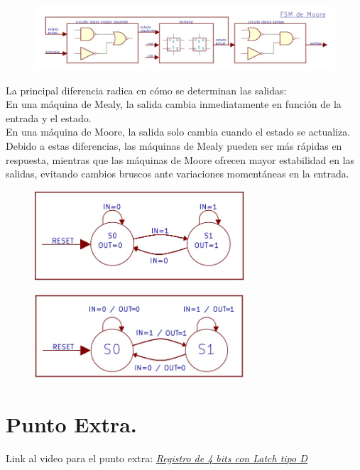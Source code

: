 \documentclass[12pt,letterpaper]{article}
\begin{document}
\begin{enumerate}
\begin{enumerate}[label=\arabic*)]
      \begin{figure}[H]
        \centering
        \includegraphics[width=1.1\textwidth]{imagen1.png}
      \end{figure}
    \end{enumerate}

    La principal diferencia radica en cómo se determinan las salidas:\\
    En una máquina de Mealy, la salida cambia inmediatamente en función de la entrada y el estado.\\
    En una máquina de Moore, la salida solo cambia cuando el estado se actualiza.\\
    Debido a estas diferencias, las máquinas de Mealy pueden ser más rápidas en respuesta, mientras que las máquinas de Moore ofrecen mayor estabilidad en las salidas, evitando cambios bruscos ante variaciones momentáneas en la entrada.
    
    \begin{figure}[H]
      \centering
      \includegraphics[width=0.7\textwidth]{imagen3.png}
    \end{figure}
    
    \begin{figure}[H]
      \centering
      \includegraphics[width=0.7\textwidth]{imagen4.png}
    \end{figure}
\end{enumerate}

\section*{Punto Extra.}
Link al video para el punto extra:
\href{https://drive.google.com/file/d/1H5akXyFdoc_lS8LiLSPnFHDVVvcUcsfj/view?usp=drivesdk}{\textit{\uline{Registro de 4 bits con Latch tipo D}}}
\end{document}
